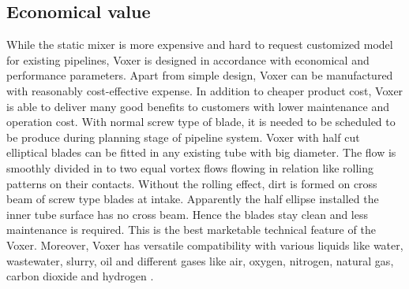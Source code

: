 \subsection{Economical value}
While the static mixer is more expensive and hard to request customized model for existing pipelines, Voxer is designed in accordance with economical and performance parameters. Apart from simple design, Voxer can be manufactured with reasonably cost-effective expense. In addition to cheaper product cost, Voxer is able to deliver many good benefits to customers with lower maintenance and operation cost.
With normal screw type of blade, it is needed to be scheduled to be produce during planning stage of pipeline system. Voxer with half cut elliptical blades can be fitted in any existing tube with big diameter. The flow is smoothly divided in to two equal vortex flows flowing in relation like rolling patterns on their contacts. Without the rolling effect, dirt is formed on cross beam of screw type blades at intake. Apparently the half ellipse installed the inner tube surface has no cross beam. Hence the blades stay clean and less maintenance is required. This is the best marketable technical feature of the Voxer. Moreover, Voxer has versatile compatibility with various liquids like water, wastewater, slurry, oil and different gases like air, oxygen, nitrogen, natural gas, carbon dioxide and hydrogen \cite{voxer:article}. 
\clearpage %

